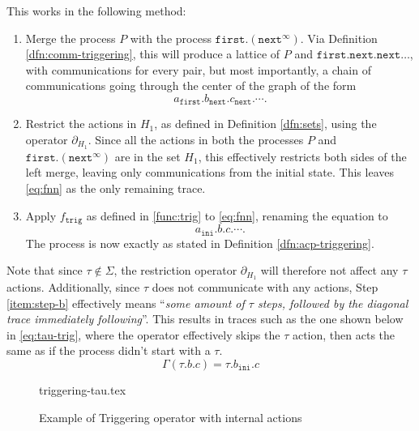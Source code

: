 \documentclass[../hons_project.tex]{subfiles}
\begin{document}
This works in the following method:
\vspace{-5pt}
\begin{enumerate}[label=\alph*)]
	\item Merge the process $P$ with the process $\mathtt{first}.(\mathtt{next}^{\infty})$. Via Definition \ref{dfn:comm-triggering}, this will produce a lattice of $P$ and $\mathtt{first}.\mathtt{next}.\mathtt{next}\dots$, with communications for every pair, but most importantly, a chain of communications going through the center of the graph of the form
	      \begin{equation}\label{eq:fnn}
		      a_{\mathtt{first}}. b_{\mathtt{next}} . c_{\mathtt{next}}. \cdots .
	      \end{equation}
	\item Restrict the actions in $H_{1}$, as defined in Definition \ref{dfn:sets}, using the operator $\partial_{H_{1}}$. Since all the actions in both the processes $P$ and $\mathtt{first}.(\mathtt{next}^{\infty})$ are in the set $H_{1}$, this effectively restricts both sides of the left merge, leaving only communications from the initial state. This leaves \cref{eq:fnn} as the only remaining trace.\label{item:step-b}
	\item Apply $f_{\mathtt{trig}}$ as defined in \cref{func:trig} to \cref{eq:fnn}, renaming the equation to
	      \begin{equation}\label{eq:gamma-result}
		      a_{\mathtt{ini}}. b . c. \cdots .
	      \end{equation}
	      The process is now exactly as stated in Definition \ref{dfn:acp-triggering}.
\end{enumerate}

Note that since $\tau\not\in \Sigma$, the restriction operator $\partial_{H_{1}}$ will therefore not affect any $\tau$ actions. Additionally, since $\tau$ does not communicate with any actions, Step \ref{item:step-b} effectively means ``\textit{some amount of $\tau$ steps, followed by the diagonal trace immediately following}''. This results in traces such as the one shown below in \cref{eq:tau-trig}, where the operator effectively skips the $\tau$ action, then acts the same as if the process didn't start with a $\tau$.
\begin{equation}\label{eq:tau-trig}
	\Gamma(\tau.b.c) = \tau.b_{\mathtt{ini}}.c
\end{equation}

\begin{figure}[!h]
	\centering
	{triggering-tau.tex}
	\caption{Example of Triggering operator with internal actions}
	\label{fig:triggering-tau}
\end{figure}
\end{document}
